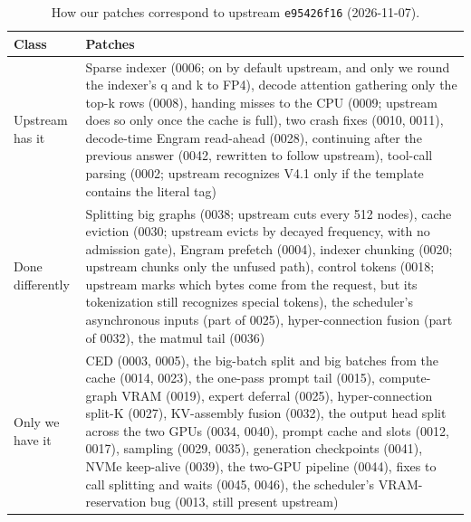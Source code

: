 \documentclass[11pt,a4paper]{article}
\newcommand{\code}[1]{\texttt{#1}}
\begin{document}
\begin{table}[h]
  \centering
  \small
  \caption{How our patches correspond to upstream \code{e95426f16} (2026-11-07).}
  \label{tab:upstreamcode}
  \begin{tabularx}{\textwidth}{@{}>{\raggedright\arraybackslash}p{2.6cm} X@{}}
    \toprule
    Class & Patches \\
    \midrule
    Upstream has it & Sparse indexer (0006; on by default upstream, and only we round the indexer's q and k to FP4), decode attention gathering only the top-k rows (0008), handing misses to the CPU (0009; upstream does so only once the cache is full), two crash fixes (0010, 0011), decode-time Engram read-ahead (0028), continuing after the previous answer (0042, rewritten to follow upstream), tool-call parsing (0002; upstream recognizes V4.1 only if the template contains the literal tag) \\
    Done differently & Splitting big graphs (0038; upstream cuts every 512 nodes), cache eviction (0030; upstream evicts by decayed frequency, with no admission gate), Engram prefetch (0004), indexer chunking (0020; upstream chunks only the unfused path), control tokens (0018; upstream marks which bytes come from the request, but its tokenization still recognizes special tokens), the scheduler's asynchronous inputs (part of 0025), hyper-connection fusion (part of 0032), the matmul tail (0036) \\
    Only we have it & CED (0003, 0005), the big-batch split and big batches from the cache (0014, 0023), the one-pass prompt tail (0015), compute-graph VRAM (0019), expert deferral (0025), hyper-connection split-K (0027), KV-assembly fusion (0032), the output head split across the two GPUs (0034, 0040), prompt cache and slots (0012, 0017), sampling (0029, 0035), generation checkpoints (0041), NVMe keep-alive (0039), the two-GPU pipeline (0044), fixes to call splitting and waits (0045, 0046), the scheduler's VRAM-reservation bug (0013, still present upstream) \\
    \bottomrule
  \end{tabularx}
\end{table}
\end{document}
